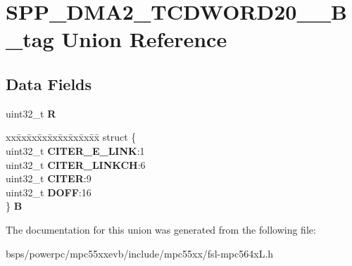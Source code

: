\hypertarget{unionSPP__DMA2__TCDWORD20____32B__tag}{}\section{S\+P\+P\+\_\+\+D\+M\+A2\+\_\+\+T\+C\+D\+W\+O\+R\+D20\+\_\+\+\_\+B\+\_\+tag Union Reference}
\label{unionSPP__DMA2__TCDWORD20____32B__tag}
\subsection*{Data Fields}
\begin{DoxyCompactItemize}
\item 
\mbox{\label{unionSPP__DMA2__TCDWORD20____32B__tag_a1850de5654b40b177912c1d040de0f42}} 
uint32\+\_\+t {\bfseries R}
\item 
\mbox{\label{unionSPP__DMA2__TCDWORD20____32B__tag_aad059c135cd8860c39c8d0a8a30c9c50}} 
\begin{tabbing}
xx\=xx\=xx\=xx\=xx\=xx\=xx\=xx\=xx\=\kill
struct \{\\
\>uint32\_t {\bfseries CITER\_E\_LINK}:1\\
\>uint32\_t {\bfseries CITER\_LINKCH}:6\\
\>uint32\_t {\bfseries CITER}:9\\
\>uint32\_t {\bfseries DOFF}:16\\
\} {\bfseries B}\\

\end{tabbing}\end{DoxyCompactItemize}


The documentation for this union was generated from the following file\+:\begin{DoxyCompactItemize}
\item 
bsps/powerpc/mpc55xxevb/include/mpc55xx/fsl-\/mpc564x\+L.\+h\end{DoxyCompactItemize}
